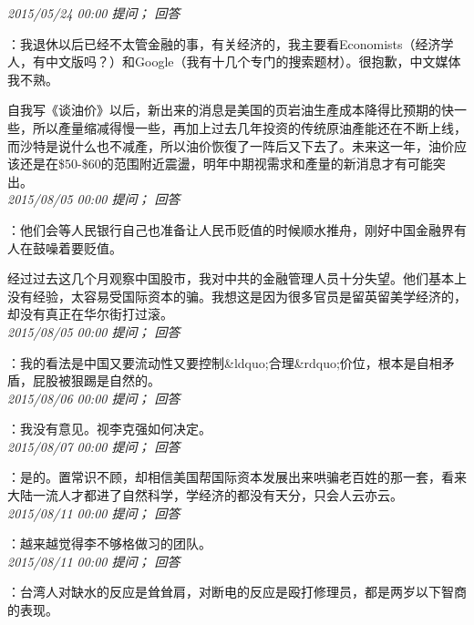 \documentclass[twocolumn]{ctexart}
\begin{document}
\textit{\hfill\noindent\small 2015/05/24 00:00 提问； 回答}

：我退休以后已经不太管金融的事，有关经济的，我主要看Economists（经济学人，有中文版吗？）和Google（我有十几个专门的搜索题材）。很抱歉，中文媒体我不熟。

自我写《谈油价》以后，新出来的消息是美国的页岩油生產成本降得比预期的快一些，所以產量缩减得慢一些，再加上过去几年投资的传统原油產能还在不断上线，而沙特是说什么也不减產，所以油价恢復了一阵后又下去了。未来这一年，油价应该还是在\$50-\$60的范围附近震盪，明年中期视需求和產量的新消息才有可能突出。\\

\textit{\hfill\noindent\small 2015/08/05 00:00 提问； 回答}

：他们会等人民银行自己也准备让人民币贬值的时候顺水推舟，刚好中国金融界有人在鼓噪着要贬值。

经过过去这几个月观察中国股市，我对中共的金融管理人员十分失望。他们基本上没有经验，太容易受国际资本的骗。我想这是因为很多官员是留英留美学经济的，却没有真正在华尔街打过滚。\\

\textit{\hfill\noindent\small 2015/08/05 00:00 提问； 回答}

：我的看法是中国又要流动性又要控制\&ldquo;合理\&rdquo;价位，根本是自相矛盾，屁股被狠踢是自然的。\\

\textit{\hfill\noindent\small 2015/08/06 00:00 提问； 回答}

：我没有意见。视李克强如何决定。\\

\textit{\hfill\noindent\small 2015/08/07 00:00 提问； 回答}

：是的。置常识不顾，却相信美国帮国际资本发展出来哄骗老百姓的那一套，看来大陆一流人才都进了自然科学，学经济的都没有天分，只会人云亦云。\\

\textit{\hfill\noindent\small 2015/08/11 00:00 提问； 回答}

：越来越觉得李不够格做习的团队。\\

\textit{\hfill\noindent\small 2015/08/11 00:00 提问； 回答}

：台湾人对缺水的反应是耸耸肩，对断电的反应是殴打修理员，都是两岁以下智商的表现。\\
\end{document}
